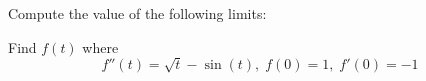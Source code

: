 \documentclass[11pt,fleqn]{exam}
\begin{document}
\begin{questions}
\question[20] Compute the value of the following limits:
\addpoints\newpage
\question[15] Find $f(t)$ where $$f''(t)=\sqrt{t}-\sin(t),\;f(0)=1,\; f'(0)=-1$$

\end{questions}
\end{document}

